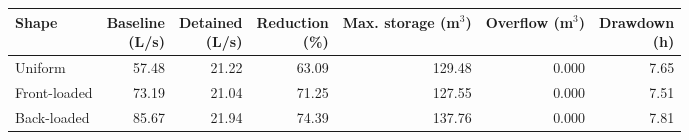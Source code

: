 \begin{tabular}{lrrrrrr}
\toprule
Shape & \shortstack{Baseline\\(L/s)} & \shortstack{Detained\\(L/s)} & \shortstack{Reduction\\(\%)} & \shortstack{Max. storage\\(m$^3$)} & \shortstack{Overflow\\(m$^3$)} & \shortstack{Drawdown\\(h)} \\
\midrule
Uniform & 57.48 & 21.22 & 63.09 & 129.48 & 0.000 & 7.65 \\
Front-loaded & 73.19 & 21.04 & 71.25 & 127.55 & 0.000 & 7.51 \\
Back-loaded & 85.67 & 21.94 & 74.39 & 137.76 & 0.000 & 7.81 \\
\bottomrule
\end{tabular}
